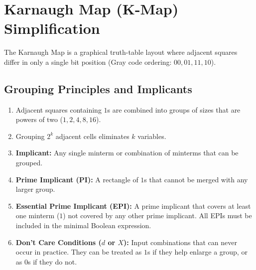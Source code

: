 \documentclass[12pt,a4paper]{article}
\begin{document}
\section{Karnaugh Map (K-Map) Simplification}

The Karnaugh Map is a graphical truth-table layout where adjacent squares differ in only a single bit position (Gray code ordering: $00, 01, 11, 10$).

\subsection{Grouping Principles and Implicants}
\begin{enumerate}[label=\arabic*., leftmargin=*]
  \item Adjacent squares containing $1$s are combined into groups of sizes that are powers of two ($1, 2, 4, 8, 16$).
  \item Grouping $2^k$ adjacent cells eliminates $k$ variables.
  \item \textbf{Implicant:} Any single minterm or combination of minterms that can be grouped.
  \item \textbf{Prime Implicant (PI):} A rectangle of $1$s that cannot be merged with any larger group.
  \item \textbf{Essential Prime Implicant (EPI):} A prime implicant that covers at least one minterm ($1$) not covered by any other prime implicant. All EPIs must be included in the minimal Boolean expression.
  \item \textbf{Don't Care Conditions ($d$ or $X$):} Input combinations that can never occur in practice. They can be treated as $1$s if they help enlarge a group, or as $0$s if they do not.
\end{enumerate}
\end{document}
